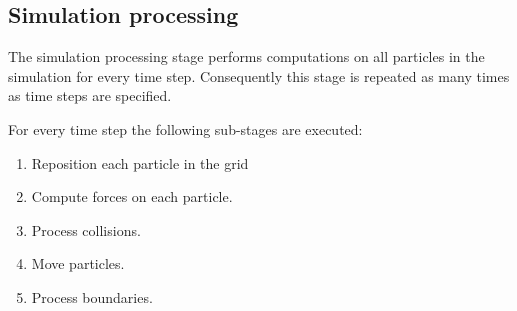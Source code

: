 \subsection{Simulation processing}

The simulation processing stage performs computations on all particles in the
simulation for every time step. Consequently this stage is repeated as many
times as time steps are specified.

For every time step the following sub-stages are executed:

\begin{enumerate}

\item Reposition each particle in the grid
\item Compute forces on each particle.
\item Process collisions.
\item Move particles.
\item Process boundaries.

\end{enumerate}






